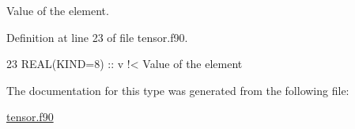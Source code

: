 Value of the element. 



Definition at line 23 of file tensor.\+f90.


\begin{DoxyCode}
23      \textcolor{keywordtype}{REAL(KIND=8)} :: v\textcolor{comment}{ !< Value of the element}
\end{DoxyCode}


The documentation for this type was generated from the following file\+:\begin{DoxyCompactItemize}
\item 
\hyperlink{tensor_8f90}{tensor.\+f90}\end{DoxyCompactItemize}
